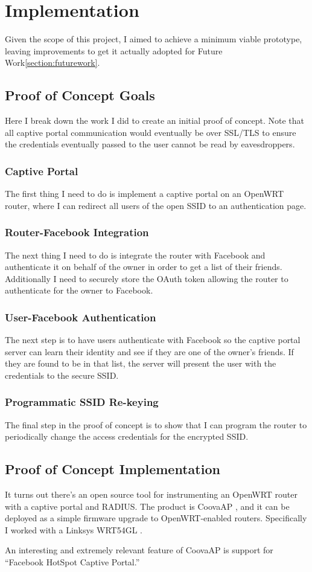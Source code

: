 \section{Implementation}
\label{section:implementation}
Given the scope of this project, I aimed to achieve a minimum viable prototype, leaving improvements
to get it actually adopted for Future Work\ref{section:futurework}.

\subsection{Proof of Concept Goals}
Here I break down the work I did to create an initial proof of concept. Note that all captive portal
communication would eventually be over SSL/TLS to ensure the credentials eventually passed to the
user cannot be read by eavesdroppers.

\subsubsection{Captive Portal}
The first thing I need to do is implement a captive portal on an OpenWRT router, where I can
redirect all users of the open SSID to an authentication page.

\subsubsection{Router-Facebook Integration}
The next thing I need to do is integrate the router with Facebook and authenticate it on behalf of
the owner in order to get a list of their friends. Additionally I need to securely store the OAuth
token allowing the router to authenticate for the owner to Facebook.

\subsubsection{User-Facebook Authentication}
The next step is to have users authenticate with Facebook so the captive portal server can learn
their identity and see if they are one of the owner's friends. If they are found to be in that list,
the server will present the user with the credentials to the secure SSID.

\subsubsection{Programmatic SSID Re-keying}
The final step in the proof of concept is to show that I can program the router to periodically
change the access credentials for the encrypted SSID.

\subsection{Proof of Concept Implementation}
It turns out there's an open source tool for instrumenting an OpenWRT router with a captive portal
and RADIUS. The product is CoovaAP \cite{product:CoovaAP}, and it can be deployed as a simple
firmware upgrade to OpenWRT-enabled routers. Specifically I worked with a Linksys WRT54GL
\cite{product:WRT54GL}.

An interesting and extremely relevant feature of CoovaAP is support for ``Facebook HotSpot Captive
Portal.''